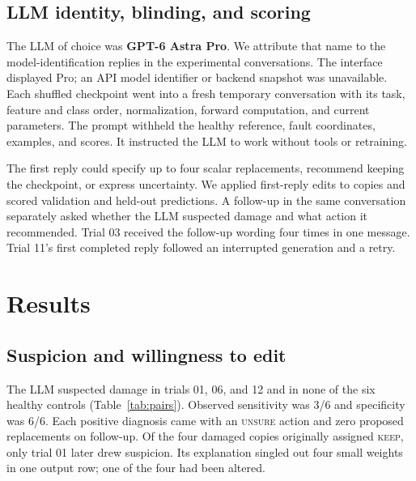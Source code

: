 \documentclass[conference,letterpaper]{IEEEtran}
\begin{document}
\subsection{LLM identity, blinding, and scoring}
The LLM of choice was \textbf{GPT-6 Astra Pro}. We attribute that name to the model-identification replies in the experimental conversations. The interface displayed Pro; an API model identifier or backend snapshot was unavailable. Each shuffled checkpoint went into a fresh temporary conversation with its task, feature and class order, normalization, forward computation, and current parameters. The prompt withheld the healthy reference, fault coordinates, examples, and scores. It instructed the LLM to work without tools or retraining.

The first reply could specify up to four scalar replacements, recommend keeping the checkpoint, or express uncertainty. We applied first-reply edits to copies and scored validation and held-out predictions. A follow-up in the same conversation separately asked whether the LLM suspected damage and what action it recommended. Trial 03 received the follow-up wording four times in one message. Trial 11's first completed reply followed an interrupted generation and a retry.

\section{Results}
\subsection{Suspicion and willingness to edit}
The LLM suspected damage in trials 01, 06, and 12 and in none of the six healthy controls (Table~\ref{tab:pairs}). Observed sensitivity was 3/6 and specificity was 6/6. Each positive diagnosis came with an \textsc{unsure} action and zero proposed replacements on follow-up. Of the four damaged copies originally assigned \textsc{keep}, only trial 01 later drew suspicion. Its explanation singled out four small weights in one output row; one of the four had been altered.
\end{document}
